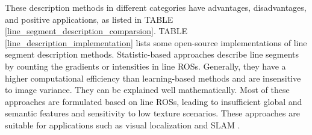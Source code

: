 \documentclass[journal,compsoc]{IEEEtran}
\begin{document}
These description methods in different categories have advantages, disadvantages, and positive applications, as listed in TABLE \ref{line_segment_description_comparsion}. TABLE \ref{line_description_implementation} lists some open-source implementations of line segment description methods. Statistic-based approaches describe line segments by counting the gradients or intensities in line ROSs. Generally, they have a higher computational efficiency than learning-based methods and are insensitive to image variance. They can be explained well mathematically. Most of these approaches are formulated based on line ROSs, leading to insufficient global and semantic features and sensitivity to low texture scenarios. These approaches are suitable for applications such as visual localization \cite{9106407} and SLAM \cite{FastLineDescriptionforLinebasedSLAM}.
\end{document}
